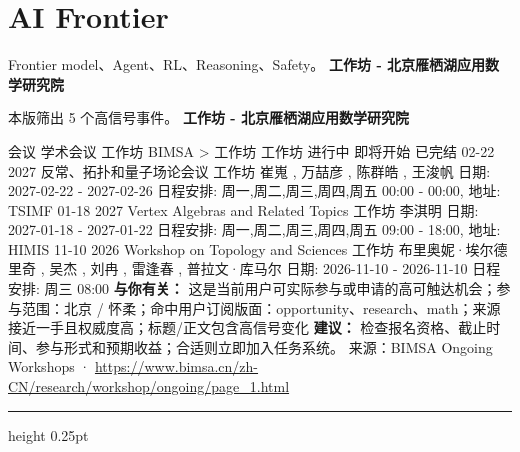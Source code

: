\documentclass[10.5pt]{ctexart}
\begin{document}
\section*{AI Frontier}
{\color{ormuted} Frontier model、Agent、RL、Reasoning、Safety。}
\vspace{2mm}
{\LARGE\bfseries 工作坊 - 北京雁栖湖应用数学研究院}\par
\vspace{1mm}
{\color{ormuted} 本版筛出 5 个高信号事件。}
\vspace{3mm}
{\Large\bfseries 工作坊 - 北京雁栖湖应用数学研究院}\par
会议 学术会议 工作坊 BIMSA > 工作坊 工作坊 进行中 即将开始 已完结 02-22 2027 反常、拓扑和量子场论会议 工作坊 崔嵬 , 万喆彦 , 陈群皓 , 王浚帆 日期: 2027-02-22 - 2027-02-26 日程安排: 周一,周二,周三,周四,周五 00:00 - 00:00, 地址: TSIMF 01-18 2027 Vertex Algebras and Related Topics 工作坊 李淇明 日期: 2027-01-18 - 2027-01-22 日程安排: 周一,周二,周三,周四,周五 09:00 - 18:00, 地址: HIMIS 11-10 2026 Workshop on Topology and Sciences 工作坊 布里奥妮·埃尔德里奇 , 吴杰 , 刘冉 , 雷逢春 , 普拉文·库马尔 日期: 2026-11-10 - 2026-11-10 日程安排: 周三 08:00
\textbf{与你有关：} 这是当前用户可实际参与或申请的高可触达机会；参与范围：北京 / 怀柔；命中用户订阅版面：opportunity、research、math；来源接近一手且权威度高；标题/正文包含高信号变化
\textbf{建议：} 检查报名资格、截止时间、参与形式和预期收益；合适则立即加入任务系统。
{\footnotesize\color{ormuted} 来源：BIMSA Ongoing Workshops · \url{https://www.bimsa.cn/zh-CN/research/workshop/ongoing/page_1.html}}
\vspace{4mm}
\hrule height 0.25pt
\vspace{3mm}
\end{document}

